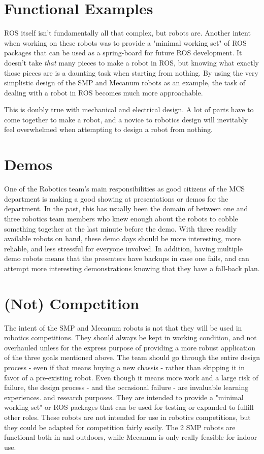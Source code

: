 \section{Functional Examples}

ROS itself isn't fundamentally all that complex, but robots are. Another intent when working on these robots was to provide a "minimal working set" of ROS packages that can be used as a spring-board for future ROS development. It doesn't take \textit{that} many pieces to make a robot in ROS, but knowing what exactly those pieces are is a daunting task when starting from nothing. By using the very simplistic design of the SMP and Mecanum robots as an example, the task of dealing with a robot in ROS becomes much more approachable.

This is doubly true with mechanical and electrical design. A lot of parts have to come together to make a robot, and a novice to robotics design will inevitably feel overwhelmed when attempting to design a robot from nothing.

\section{Demos}

One of the Robotics team's main responsibilities as good citizens of the MCS department is making a good showing at presentations or demos for the department. In the past, this has usually been the domain of between one and three robotics team members who knew enough about the robots to cobble something together at the last minute before the demo. With three readily available robots on hand, these demo days should be more interesting, more reliable, and less stressful for everyone involved. In addition, having multiple demo robots means that the presenters have backups in case one fails, and can attempt more interesting demonstrations knowing that they have a fall-back plan.

\section{(Not) Competition}

The intent of the SMP and Mecanum robots is not that they will be used in robotics competitions. They should always be kept in working condition, and not overhauled unless for the express purpose of providing a more robust application of the three goals mentioned above. The team should go through the entire design process - even if that means buying a new chassis - rather than skipping it in favor of a pre-existing robot. Even though it means more work and a large risk of failure, the design process - and the occasional failure - are invaluable learning experiences.
and research purposes. They are intended to provide a "minimal working set" or ROS packages that can be used for testing or expanded to fulfill other roles. These robots are not intended for use in robotics competitions, but they could be adapted for competition fairly easily. The 2 SMP robots are functional both in and outdoors, while Mecanum is only really feasible for indoor use.
